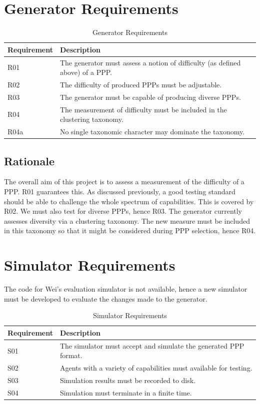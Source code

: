 \documentclass[authoryearcitations]{UoYCSproject}
\begin{document}
\section{Generator Requirements}
\label{sec:pa4}
\begin{table}
\begin{tabular}{|l | p{9cm}|}
\hline
Requirement & Description \\
\hline
R01 & The generator must assess a notion of difficulty (as defined above) of a PPP.\\
R02 & The difficulty of produced PPPs must be adjustable.\\
R03 & The generator must be capable of producing diverse PPPs.\\
R04 & The measurement of difficulty must be included in the clustering taxonomy.\\
R04a & No single taxonomic character may dominate the taxonomy.\\
\hline
\end{tabular}
\caption{Generator Requirements}
\label{table:genreq}
\end{table}

\subsection{Rationale}
\label{sec:pa4_rat}
The overall aim of this project is to assess a measurement of the difficulty of a PPP. R01 guarantees this. As discussed previously, a good testing standard should be able to challenge the whole spectrum of capabilities. This is covered by R02. We must also test for diverse PPPs, hence R03. The generator currently assesses diversity via a clustering taxonomy. The new measure must be included in this taxonomy so that it might be considered during PPP selection, hence R04.

\section{Simulator Requirements}
\label{sec:pa5}
The code for Wei's evaluation simulator is not available, hence a new simulator must be developed to evaluate the changes made to the generator.\\

\begin{table}
\begin{tabular}{|l | p{9cm}|}
\hline
Requirement & Description \\
\hline
S01 & The simulator must accept and simulate the generated PPP format.\\
S02 & Agents with a variety of capabilities must available for testing.\\
S03 & Simulation results must be recorded to disk.\\
S04 & Simulation must terminate in a finite time.\\
\hline
\end{tabular}
\caption{Simulator Requirements}
\label{table:simreq}
\end{table}
\end{document}
